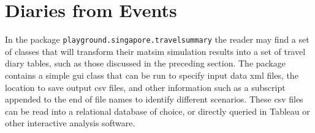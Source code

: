 \section{Diaries from Events}
In the package \lstinline|playground.singapore.travelsummary| the reader may find a set of classes that will transform their \gls{matsim} simulation results into a set of travel diary tables, such as those discussed in the preceding section. The package contains a simple \gls{gui} class that can be run to specify input data \gls{xml} files, the location to save output \gls{csv} files, and other information such as a subscript appended to the end of file names to identify different scenarios. These \gls{csv} files can be read into a relational database of choice, or directly queried in Tableau or other interactive analysis software.





